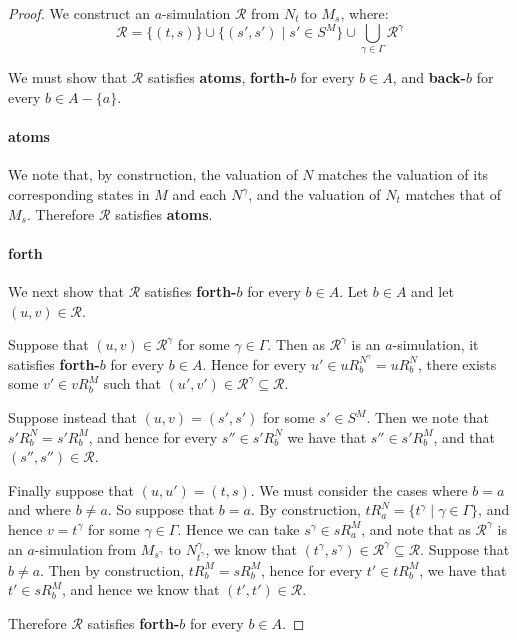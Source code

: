 \begin{proof}
We construct an $a$-simulation $\mathcal{R}$ from $N_t$ to $M_s$, where:
$$\mathcal{R} = \{(t, s)\} \cup \{(s', s') \mid s' \in S^M \} 
\cup \bigcup_{\gamma \in \Gamma} \mathcal{R}^\gamma$$

We must show that $\mathcal{R}$ satisfies {\bf atoms}, {\bf forth-$b$} for every
$b \in A$, and {\bf back-$b$} for every $b \in A - \{a\}$.

\paragraph{atoms} We note that, by construction, the valuation of $N$ matches
the valuation of its corresponding states in $M$ and each $N^\gamma$, and the
valuation of $N_t$ matches that of $M_s$. Therefore $\mathcal{R}$ satisfies {\bf
atoms}.

\paragraph{forth} We next show that $\mathcal{R}$ satisfies {\bf forth-$b$} for
every $b \in A$.  Let $b \in A$ and let $(u, v) \in \mathcal{R}$.

Suppose that $(u, v) \in \mathcal{R}^\gamma$ for some $\gamma \in \Gamma$.  Then
as $\mathcal{R}^\gamma$ is an $a$-simulation, it satisfies {\bf forth-$b$} for
every $b \in A$. Hence for every $u' \in uR^{N^\gamma}_b = uR^N_b$, there exists
some $v' \in vR^M_b$ such that $(u', v') \in \mathcal{R}^\gamma \subseteq
\mathcal{R}$. 

Suppose instead that $(u, v) = (s', s')$ for some $s' \in S^M$.  Then we note
that $s'R^N_b = s'R^M_b$, and hence for every $s'' \in s'R^N_b$ we have that
$s'' \in s'R^M_b$, and that $(s'', s'') \in \mathcal{R}$. 

Finally suppose that $(u, u') = (t, s)$. We must consider the cases where $b =
a$ and where $b \neq a$. So suppose that $b = a$. By construction, $tR^N_a =
\{t^\gamma \mid \gamma \in \Gamma\}$, and hence $v = t^\gamma$ for some $\gamma
\in \Gamma$. Hence we can take $s^\gamma \in sR^M_a$, and note that as
$\mathcal{R}^\gamma$ is an $a$-simulation from $M_{s^\gamma}$ to
$N^\gamma_{t^\gamma}$, we know that $(t^\gamma, s^\gamma) \in \mathcal{R}^\gamma
\subseteq \mathcal{R}$. Suppose that $b \neq a$. Then by construction, $tR^M_b =
sR^M_b$, hence for every $t' \in tR^M_b$, we have that $t' \in sR^M_b$, and
hence we know that $(t', t') \in \mathcal{R}$. 

Therefore $\mathcal{R}$ satisfies {\bf forth-$b$} for every $b \in A$.


\end{proof}
